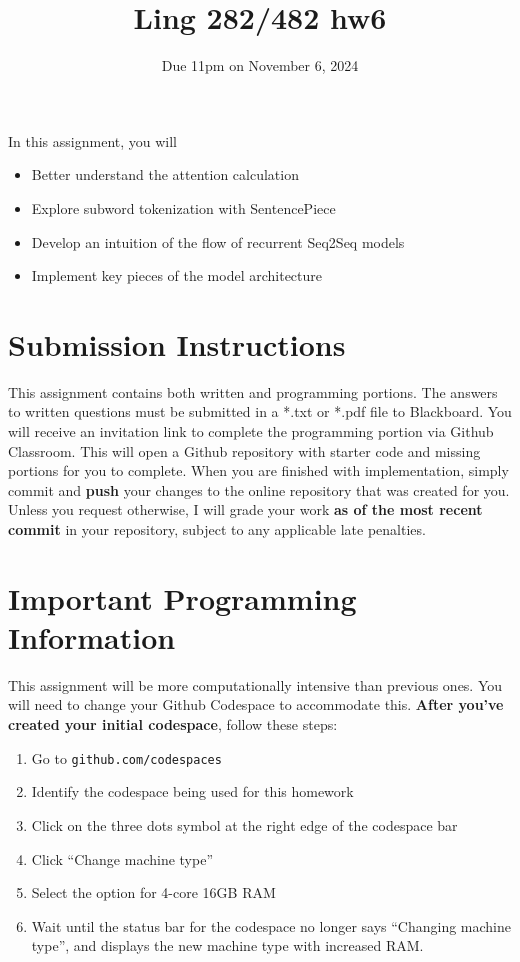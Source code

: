 \documentclass[11pt]{article}
\begin{document}
\title{Ling 282/482 hw6}
\date{\vspace{-0.2in}Due 11pm on November 6, 2024}
\maketitle


\noindent In this assignment, you will 
\begin{itemize}
  \item Better understand the attention calculation
  \item Explore subword tokenization with SentencePiece
  \item Develop an intuition of the flow of recurrent Seq2Seq models
  \item Implement key pieces of the model architecture
\end{itemize}

\section*{Submission Instructions}
This assignment contains both written and programming portions. The answers to written questions must be submitted in a *.txt or *.pdf file to Blackboard. You will receive an invitation link to complete the programming portion via Github Classroom. This will open a Github repository with starter code and missing portions for you to complete. When you are finished with implementation, simply commit and \textbf{push} your changes to the online repository that was created for you. Unless you request otherwise, I will grade your work \textbf{as of the most recent commit} in your repository, subject to any applicable late penalties.

\section*{Important Programming Information}
This assignment will be more computationally intensive than previous ones. You will need to change your Github Codespace to accommodate this. \textbf{After you've created your initial codespace}, follow these steps:

\begin{enumerate}
  \item Go to \texttt{github.com/codespaces}
  \item Identify the codespace being used for this homework
  \item Click on the three dots symbol at the right edge of the codespace bar
  \item Click ``Change machine type''
  \item Select the option for 4-core 16GB RAM
  \item Wait until the status bar for the codespace no longer says ``Changing machine type'', and displays the new machine type with increased RAM.
\end{enumerate}
\end{document}
